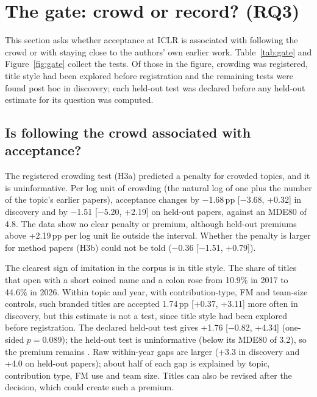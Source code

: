 \section{The gate: crowd or record? (RQ3)}
\label{sec:gate}

This section asks whether acceptance at ICLR is associated with following the crowd or with staying close to the
authors' own earlier work. Table~\ref{tab:gate} and Figure~\ref{fig:gate} collect the tests. Of those in the figure,
crowding was registered, title style had been explored before registration and the remaining tests were found post hoc
in discovery; each held-out test was declared before any held-out estimate for its question was computed.

\subsection{Is following the crowd associated with acceptance?}
The registered crowding test (H3a) predicted a penalty for crowded topics, and it is uninformative. Per log unit of
crowding (the natural log of one plus the number of the topic's earlier papers), acceptance changes by $-$1.68\,pp
[$-$3.68, +0.32] in discovery and by $-$1.51 [$-$5.20, +2.19] on held-out papers, against an MDE80 of 4.8. The data
show no clear penalty or premium, although held-out premiums above +2.19\,pp per log unit lie outside the interval.
Whether the penalty is larger for method papers (H3b) could not be told ($-$0.36 [$-$1.51, +0.79]).

The clearest sign of imitation in the corpus is in title style. The share of titles that open with a short coined
name and a colon rose from 10.9\% in 2017 to 44.6\% in 2026. Within topic and year, with contribution-type, FM and
team-size controls, such branded titles are accepted 1.74\,pp [+0.37, +3.11] more often in discovery, but this estimate
is not a test, since title style had been explored before registration. The declared held-out test gives +1.76
[$-$0.82, +4.34] (one-sided $p = 0.089$); the held-out test is uninformative (below its MDE80 of 3.2), so the premium
remains . Raw within-year gaps are larger (+3.3 in discovery and +4.0 on held-out papers); about half
of each gap is explained by topic, contribution type, FM use and team size. Titles can also be revised after the
decision, which could create such a premium.

